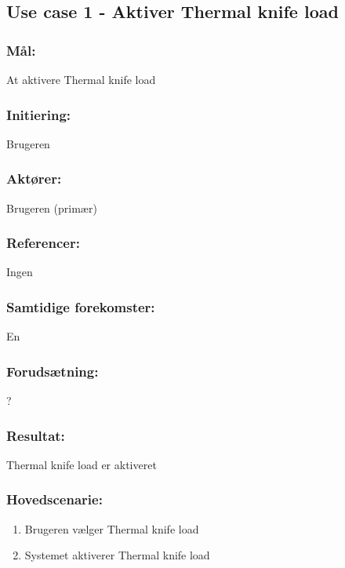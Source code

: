 \begin{framed}
	\subsection{Use case 1 - Aktiver Thermal knife load}
	\subsubsection*{Mål:}
	At aktivere Thermal knife load
	
	\subsubsection*{Initiering:}
	Brugeren
	
	\subsubsection*{Aktører:}
	Brugeren (primær)
	
	\subsubsection*{Referencer:}
	Ingen
	
	\subsubsection*{Samtidige forekomster:}
	En
	
	\subsubsection*{Forudsætning:}
	
	?
	
	\subsubsection*{Resultat:}
	
	Thermal knife load er aktiveret
	
	\subsubsection*{Hovedscenarie:}
	\begin{enumerate}
		\item Brugeren vælger Thermal knife load
		\item Systemet aktiverer Thermal knife load
	\end{enumerate}
	
\end{framed}

